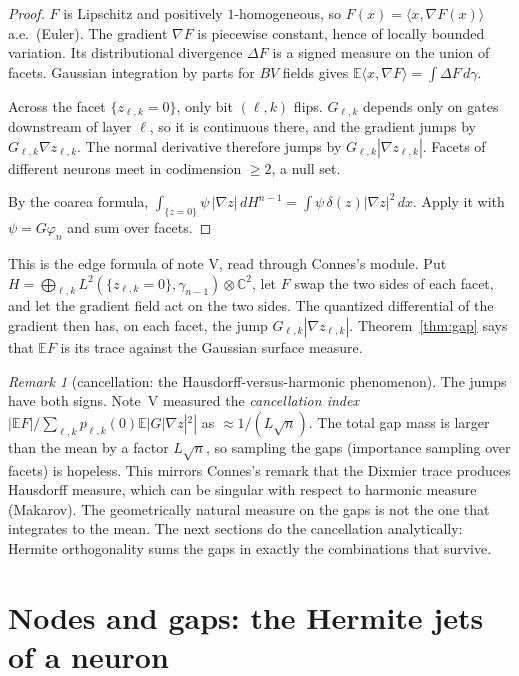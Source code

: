 \documentclass[11pt]{article}
\theoremstyle{definition}
\theoremstyle{remark}
\newtheorem{remark}[theorem]{Remark}
\newcommand{\E}{\mathbb E}
\begin{document}
\begin{proof}
$F$ is Lipschitz and positively $1$-homogeneous, so $F(x)=\langle x,\nabla F(x)\rangle$ a.e.\ (Euler). The gradient $\nabla F$ is piecewise constant, hence of locally bounded variation. Its distributional divergence $\Delta F$ is a signed measure on the union of facets. Gaussian integration by parts for $BV$ fields gives $\E\langle x,\nabla F\rangle=\int\Delta F\,d\gamma$.

Across the facet $\{z_{\ell,k}=0\}$, only bit $(\ell,k)$ flips. $G_{\ell,k}$ depends only on gates downstream of layer $\ell$, so it is continuous there, and the gradient jumps by $G_{\ell,k}\nabla z_{\ell,k}$. The normal derivative therefore jumps by $G_{\ell,k}|\nabla z_{\ell,k}|$. Facets of different neurons meet in codimension $\ge2$, a null set.

By the coarea formula, $\int_{\{z=0\}}\psi\,|\nabla z|\,dH^{n-1}=\int\psi\,\delta(z)|\nabla z|^2\,dx$. Apply it with $\psi=G\varphi_n$ and sum over facets.
\end{proof}

This is the edge formula of note V, read through Connes's module. Put $H=\bigoplus_{\ell,k}L^2(\{z_{\ell,k}=0\},\gamma_{n-1})\otimes\mathbb C^2$, let $F$ swap the two sides of each facet, and let the gradient field act on the two sides. The quantized differential of the gradient then has, on each facet, the jump $G_{\ell,k}|\nabla z_{\ell,k}|$. Theorem~\ref{thm:gap} says that $\E F$ is its trace against the Gaussian surface measure.

\begin{remark}[cancellation: the Hausdorff-versus-harmonic phenomenon]\label{rem:cancel}
The jumps have both signs. Note~V measured the \emph{cancellation index} $|\E F|/\sum_{\ell,k}p_{\ell,k}(0)\E|G|\nabla z|^2|$ as $\approx1/(L\sqrt n)$. The total gap mass is larger than the mean by a factor $L\sqrt n$, so sampling the gaps (importance sampling over facets) is hopeless. This mirrors Connes's remark that the Dixmier trace produces Hausdorff measure, which can be singular with respect to harmonic measure (Makarov). The geometrically natural measure on the gaps is not the one that integrates to the mean. The next sections do the cancellation analytically: Hermite orthogonality sums the gaps in exactly the combinations that survive.
\end{remark}

\section{Nodes and gaps: the Hermite jets of a neuron}\label{sec:jets}
\end{document}
